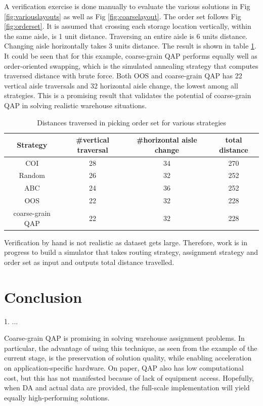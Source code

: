 \documentclass[hyp]{socreport}
\begin{document}
A verification exercise is done manually to evaluate the various solutions in Fig \ref{fig:variouslayouts} as well as Fig \ref{fig:coarselayout}. The order set follows Fig \ref{fig:orderset}. It is assumed that crossing each storage location vertically, within the same aisle, is 1 unit distance. Traversing an entire aisle is 6 units distance. Changing aisle horizontally takes 3 units distance. The result is shown in table \ref{tbl:result}. It could be seen that for this example, coarse-grain QAP performs equally well as order-oriented swapping, which is the simulated annealing strategy that computes traversed distance with brute force. Both OOS and coarse-grain QAP has 22 vertical aisle traversals and 32 horizontal aisle change, the lowest among all strategies. This is a promising result that validates the potential of coarse-grain QAP in solving realistic warehouse situations.
\begin{table}[h]
\centering
\begin{tabular}{|c|c|c|c|}
\hline
Strategy & \#vertical traversal & \#horizontal aisle change & total distance\\
\hline
COI	& 28 & 34 & 270\\
\hline
Random & 26 & 32 & 252\\
\hline
ABC & 24 & 36 & 252\\
\hline
OOS & 22 & 32 & 228\\
\hline
coarse-grain QAP & 22 & 32 & 228\\
\hline
\end{tabular}
\caption{Distances traversed in picking order set for various strategies}
\label{tbl:result}
\end{table}

Verification by hand is not realistic as dataset gets large. Therefore, work is in progress to build a simulator that takes routing strategy, assignment strategy and order set as input and outputs total distance travelled.

\chapter{Conclusion}
1. ...

Coarse-grain QAP is promising in solving warehouse assignment problems. In particular, the advantage of using this technique, as seen from the example of the current stage, is the preservation of solution quality, while enabling acceleration on application-specific hardware. On paper, QAP also has low computational cost, but this has not manifested because of lack of equipment access. Hopefully, when DA and actual data are provided, the full-scale implementation will yield equally high-performing solutions.
\end{document}
